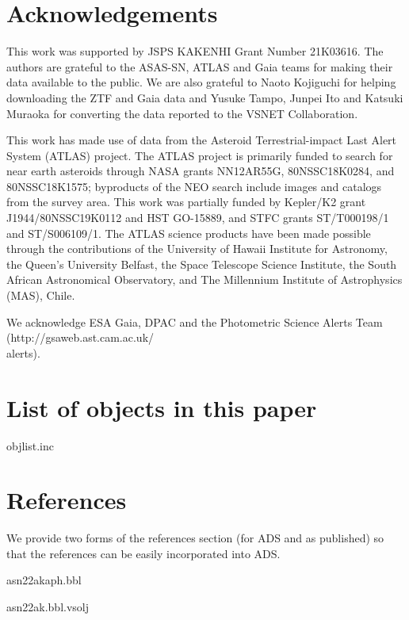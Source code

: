 \documentclass{article}
\def\xxinput#1{#1}
\newcounter{author}
\begin{document}
\section*{Acknowledgements}

This work was supported by JSPS KAKENHI Grant Number 21K03616.
The authors are grateful to the ASAS-SN, ATLAS and Gaia teams
for making their data available to the public.
We are also grateful to Naoto Kojiguchi for helping downloading
the ZTF and Gaia data and Yusuke Tampo, Junpei Ito and
Katsuki Muraoka for converting the data reported to
the VSNET Collaboration.

This work has made use of data from the Asteroid Terrestrial-impact
Last Alert System (ATLAS) project.
The ATLAS project is primarily funded to search for
near earth asteroids through NASA grants NN12AR55G, 80NSSC18K0284,
and 80NSSC18K1575; byproducts of the NEO search include images and
catalogs from the survey area. This work was partially funded by
Kepler/K2 grant J1944/80NSSC19K0112 and HST GO-15889, and STFC
grants ST/T000198/1 and ST/S006109/1. The ATLAS science products
have been made possible through the contributions of the University
of Hawaii Institute for Astronomy, the Queen's University Belfast, 
the Space Telescope Science Institute, the South African Astronomical
Observatory, and The Millennium Institute of Astrophysics (MAS), Chile.

We acknowledge ESA Gaia, DPAC and the Photometric Science Alerts Team
(http://gsaweb.ast.cam.ac.uk/\\alerts).

\section*{List of objects in this paper}
\xxinput{objlist.inc}

\section*{References}

We provide two forms of the references section (for ADS
and as published) so that the references can be easily
incorporated into ADS.

\newcommand{\noop}[1]{}\newcommand{\hyphalt}{-}

\renewcommand\refname{\textbf{References (for ADS)}}

\xxinput{asn22akaph.bbl}

\renewcommand\refname{\textbf{References (as published)}}

\xxinput{asn22ak.bbl.vsolj}
\end{document}
